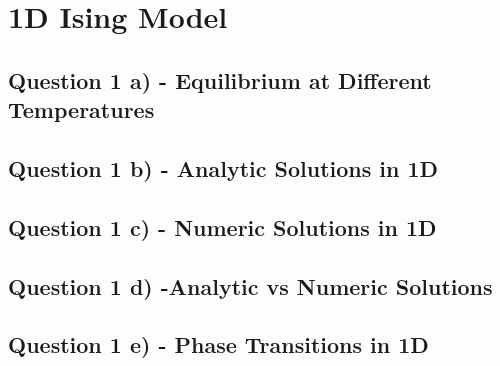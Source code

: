 \documentclass[a4paper]{article}
\begin{document}
    \section*{1D Ising Model}
        \subsection*{Question 1 a) - Equilibrium at Different Temperatures}
        \subsection*{Question 1 b) - Analytic Solutions in 1D}

        \subsection*{Question 1 c) - Numeric Solutions in 1D}

        \subsection*{Question 1 d) -Analytic vs Numeric Solutions}

        \subsection*{Question 1 e) - Phase Transitions in 1D}

        
\end{document}
